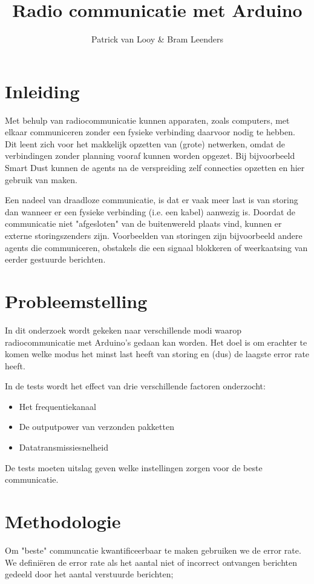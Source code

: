 \documentclass[a4paper,10pt]{article}
\title{Radio communicatie met Arduino}
\author{Patrick van Looy \& Bram Leenders}
\begin{document}
\maketitle

\section{Inleiding}
Met behulp van radiocommunicatie kunnen apparaten, zoals computers, met elkaar communiceren zonder een fysieke verbinding daarvoor nodig te hebben. Dit leent zich voor het makkelijk opzetten van (grote) netwerken, omdat de verbindingen zonder planning vooraf kunnen worden opgezet. Bij bijvoorbeeld Smart Dust kunnen de agents na de verspreiding zelf connecties opzetten en hier gebruik van maken.

Een nadeel van draadloze communicatie, is dat er vaak meer last is van storing dan wanneer er een fysieke verbinding (i.e. een kabel) aanwezig is. Doordat de communicatie niet "afgesloten" van de buitenwereld plaats vind, kunnen er externe storingszenders zijn. Voorbeelden van storingen zijn bijvoorbeeld andere agents die communiceren, obstakels die een signaal blokkeren of weerkaatsing van eerder gestuurde berichten.

\section{Probleemstelling}
In dit onderzoek wordt gekeken naar verschillende modi waarop radiocommunicatie met Arduino's gedaan kan worden. Het doel is om erachter te komen welke modus het minst last heeft van storing en (dus) de laagste error rate heeft.

In de tests wordt het effect van drie verschillende factoren onderzocht:
\begin{itemize}
    \item Het frequentiekanaal
    \item De outputpower van verzonden pakketten
    \item Datatransmissiesnelheid
\end{itemize}

De tests moeten uitslag geven welke instellingen zorgen voor de beste communicatie.

\section{Methodologie}
Om "beste" communcatie kwantificeerbaar te maken gebruiken we de error rate. We defini\"eren de error rate als het aantal niet of incorrect ontvangen berichten gedeeld door het aantal verstuurde berichten;
\end{document}
